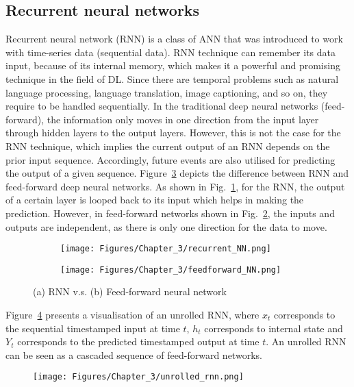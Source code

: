 \subsection{Recurrent neural networks}
\label{sec222}
Recurrent neural network (RNN) is a class of ANN that was introduced to work with time-series data (sequential data).
RNN technique can remember its data input, because of its internal memory, which makes it a powerful and promising technique in the field of DL.
Since there are temporal problems such as natural language processing, language translation, image captioning, and so on, they require to be handled sequentially.
In the traditional deep neural networks (feed-forward), the information only moves in one direction from the input layer through hidden layers to the output layers.
However, this is not the case for the RNN technique, which implies the current output of an RNN depends on the prior input sequence.
Accordingly, future events are also utilised for predicting the output of a given sequence.
Figure~\ref{fig:rnn_vs_FFNN} depicts the difference between RNN and feed-forward deep neural networks.
As shown in Fig.~\ref{fig:rrn}, for the RNN, the output of a certain layer is looped back to its input which helps in making the prediction.
However, in feed-forward networks shown in Fig.~\ref{fig:FFNN}, the inputs and outputs are independent, as there is only one direction for the data to move.
\begin{figure}[!ht]
	\centering
	\begin{subfigure}{0.49\textwidth}		
		\centering
		\texttt{[image: Figures/Chapter\_3/recurrent\_NN.png]}
		\caption{} 
		\label{fig:rrn}
	\end{subfigure}
	\hfill
	\begin{subfigure}{0.49\textwidth}
		\centering
		\texttt{[image: Figures/Chapter\_3/feedforward\_NN.png]}
		\caption{} 
		\label{fig:FFNN}
	\end{subfigure}	
	\caption{(a) RNN v.s. (b) Feed-forward neural network}
	\label{fig:rnn_vs_FFNN}
\end{figure}

Figure~\ref{unrolled_rnn} presents a visualisation of an unrolled RNN, where \(x_{t}\) corresponds to the sequential timestamped input at time \(t\), \(h_{t}\) corresponds to internal state  and \(Y_{t}\) corresponds to the predicted timestamped output at time \(t\).
An unrolled RNN can be seen as a cascaded sequence of feed-forward networks.
\begin{figure}
	\begin{center}
	\texttt{[image: Figures/Chapter\_3/unrolled\_rnn.png]}
	\end{center}
	\label{unrolled_rnn}
\end{figure}

